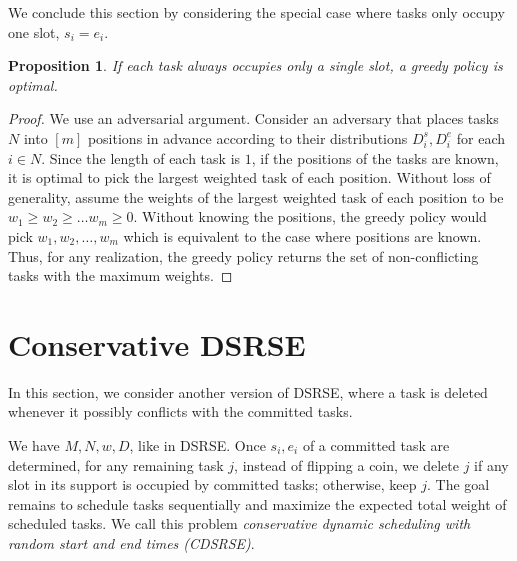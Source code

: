 \documentclass{article}
\newtheorem{proposition}[theorem]{Proposition}
\begin{document}
We conclude this section by considering the special case where tasks only occupy one slot, $ s_i = e_i $.
\begin{proposition}
    If each task always occupies only a single slot, a greedy policy is optimal.
\end{proposition}
\begin{proof}
    We use an adversarial argument.
    Consider an adversary that places tasks $N$ into $[m]$ positions in advance according to their distributions $D_i^s,D_i^e$ for each $i\in N$.
    Since the length of each task is $1$, if the positions of the tasks are known, it is optimal to pick the largest weighted task of each position.
    Without loss of generality, assume the weights of the largest weighted task of each position to be $w_1\geq w_2\geq \ldots w_m\geq 0$.
    Without knowing the positions, the greedy policy would pick $w_1,w_2,\ldots, w_m$ which is equivalent to the case where positions are known.
    Thus, for any realization, the greedy policy returns the set of non-conflicting tasks with the maximum weights.
\end{proof}
\section{Conservative DSRSE}
In this section, we consider another version of DSRSE, where a task is deleted whenever it possibly conflicts with the committed tasks.

We have $M,N,w,D$, like in DSRSE. 
Once $s_i,e_i$ of a committed task are determined, for any remaining task $j$, instead of flipping a coin, we delete $j$ if any slot in its support is occupied by committed tasks; otherwise, keep $j$.
The goal remains to schedule tasks sequentially and maximize the expected total weight of scheduled tasks.
We call this problem \emph{conservative dynamic scheduling with random start and end times (CDSRSE)}.
\end{document}
